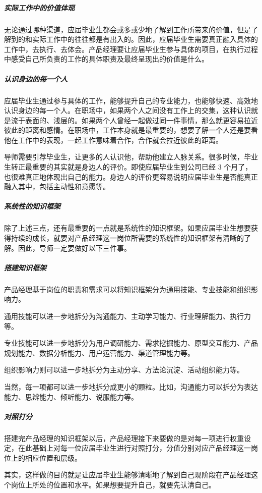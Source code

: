 \documentclass[letterpaper,10pt,english]{sphinxmanual}
\begin{document}
\subparagraph{实际工作中的价值体现}
\label{\detokenize{chapter_interview/new_like:id16}}
无论通过哪种渠道，应届毕业生都会或多或少地了解到工作所带来的价值，但是了解到的和实际工作中的往往都是有出入的。因此，应届毕业生需要真正融入具体的工作中，去执行、去体会。产品经理要让应届毕业生参与具体的项目，在执行过程中感受自己所负责的工作的具体职责及最终呈现出的价值是什么。


\subparagraph{认识身边的每一个人}
\label{\detokenize{chapter_interview/new_like:id17}}
应届毕业生通过参与具体的工作，能够提升自己的专业能力，也能够快速、高效地认识身边的每一个人。在职场中，如果两个人之间没有工作上的交集，这种认识就是流于表面的、浅层的。如果两个人曾经一起做过同一件事情，那么就更容易拉近彼此的距离和感情。在职场中，工作本身就是最重要的，想要了解一个人还是要看他在工作中的表现，一起工作意味着合作，合作就会拉近彼此的距离。

导师需要引荐毕业生，让更多的人认识他，帮助他建立人脉关系。很多时候，毕业生转正最重要的其实就是身边人的评价。即使应届毕业生到公司已经
3
个月了，也很难真正地体现出自己的能力。身边人的评价更容易说明应届毕业生是否能真正融入其中，包括主动性和意愿等。


\subparagraph{系统性的知识框架}
\label{\detokenize{chapter_interview/new_like:id18}}
除了上述三点，还有最重要的一点就是系统性的知识框架。如果应届毕业生想要获得持续的成长，就要对产品经理这一岗位所需要的系统性的知识框架有清晰的了解。因此，导师一定要做好以下三件事。


\subparagraph{搭建知识框架}
\label{\detokenize{chapter_interview/new_like:id19}}
产品经理基于岗位的职责和需求可以将知识框架分为通用技能、专业技能和组织影响力。

通用技能可以进一步地拆分为沟通能力、主动学习能力、行业理解能力、执行力等。

专业技能可以进一步地拆分为用户调研能力、需求挖掘能力、原型交互能力、产品规划能力、数据分析能力、用户运营能力、渠道管理能力等。

组织影响力则可以进一步地拆分为主动分享、方法论沉淀、活动组织能力等。

当然，每一项都可以进一步地拆分成更小的颗粒。比如，沟通能力可以拆分为表达能力、思辨能力、倾听能力、说服能力等。


\subparagraph{对照打分}
\label{\detokenize{chapter_interview/new_like:id20}}
搭建完产品经理的知识框架以后，产品经理接下来要做的是对每一项进行权重设定，在此基础上对每一位应届毕业生进行对照打分，分值分别对应产品经理这一岗位上的相应位置和层级。

其实，这样做的目的就是让应届毕业生能够清晰地了解到自己现阶段在产品经理这个岗位上所处的位置和水平。如果想要提升自己，就要先认清自己。
\end{document}
